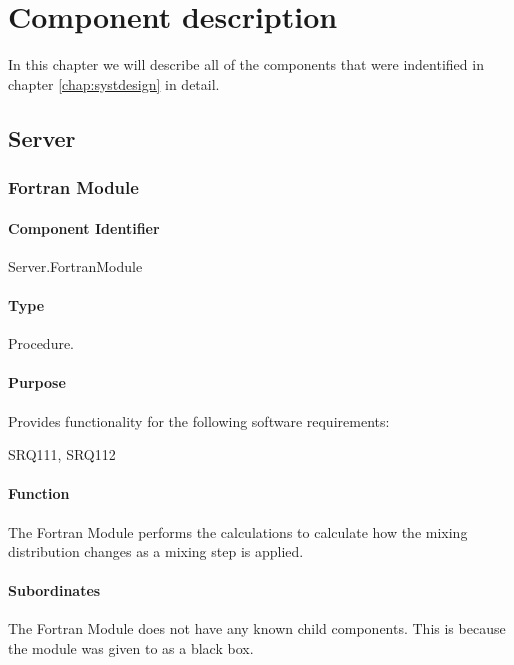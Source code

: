 \chapter{Component description}
\label{chap:compdescr}
In this chapter we will describe all of the components that were indentified in chapter \ref{chap:systdesign} in detail.

\section{Server}
\subsection{Fortran Module}
\label{subsec:fortranmodule}

\subsubsection*{Component Identifier}
Server.FortranModule

\subsubsection*{Type}
Procedure.

\subsubsection*{Purpose}
Provides functionality for the following software requirements:

\noindent SRQ111, SRQ112

\subsubsection*{Function}
The Fortran Module performs the calculations to calculate how the mixing distribution changes as a mixing step is applied.

\subsubsection*{Subordinates}
The Fortran Module does not have any known child components. This is because the module was given to \projectauthor as a black box.


